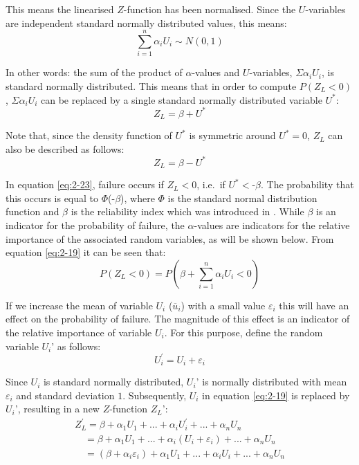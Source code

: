 This means the linearised $Z$-function has been normalised. Since the $U$-variables are independent standard normally distributed values, this means: 
\begin{equation}
\sum _{i=1}^{n}\alpha _{i} U_{i}  \sim N(0,1) \label{eq:2-22}  
\end{equation}

In other words: the sum of the product of $\alpha$-values and $U$-variables, $\Sigma$$\alpha_i U_i$, is standard normally distributed. This means that in order to compute $P(Z_L<0)$, $\Sigma$$\alpha_i U_i$ can be replaced by a single standard normally distributed variable $U^{*}$:
\begin{equation}
Z_{L} =\beta +U^{*} \label{eq:2-23}  
\end{equation}

Note that, since the density function of $U^{*}$ is symmetric around $U^{*}=0$, $Z_L$ can also be described as follows: 
\begin{equation}
Z_{L} =\beta -U^{*} \label{eq:2-24}  
\end{equation}

In equation \eqref{eq:2-23}, failure occurs if $Z_L$$<$0, i.e.\ if $U^{*}$$<$-$\beta$. The probability that this occurs is equal to $\Phi$(-$\beta$), where $\Phi$ is the standard normal distribution function and $\beta$ is the reliability index which was introduced in . While $\beta$ is an indicator for the probability of failure, the $\alpha$-values are indicators for the relative importance of the associated random variables, as will be shown below. From equation \eqref{eq:2-19} it can be seen that:
\begin{equation}
P\left(Z_{L} <0\right)=P\left(\beta +\sum _{i=1}^{n}\alpha _{i} U_{i}  <0\right) \label{eq:2-25}  
\end{equation}

If we increase the mean of variable $U_i$ ($\overline{u}_i$) with a small value $\varepsilon_i$ this will have an effect on the probability of failure. The magnitude of this effect is an indicator of the relative importance of variable $U_i$. For this purpose, define the random variable $U_i$' as follows: 
\begin{equation}
U_{i}^{'} =U_{i} +\varepsilon _{i}  \label{eq:2-26}  
\end{equation}

Since $U_i$ is standard normally distributed, $U_i$' is normally distributed with mean $\varepsilon_i$ and standard deviation $1$. Subsequently, $U_i$ in equation \eqref{eq:2-19} is replaced by $U_i$', resulting in a new $Z$-function $Z_L$':
\begin{equation}
\begin{array}{l} {Z_{L}^{'} =\beta +\alpha _{1} U_{1} +...+\alpha _{i} U_{i}^{'} +...+\alpha _{n} U_{n} } \\ {\quad  =\beta +\alpha _{1} U_{1} +...+\alpha _{i} \left(U_{i} +\varepsilon _{i} \right)+...+\alpha _{n} U_{n} } \\ {\quad  =\left(\beta +\alpha _{i} \varepsilon _{i} \right)+\alpha _{1} U_{1} +...+\alpha _{i} U_{i} +...+\alpha _{n} U_{n} } \end{array} \label{eq:2-27}  
\end{equation}

